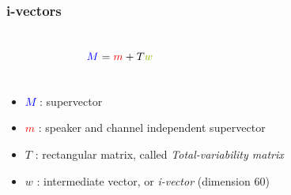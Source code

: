 \documentclass[11pt,english]{beamer}
\begin{document}
\begin{frame}
  \frametitle{i-vectors}
  \begin{columns}
    \begin{figure}
    
    \end{figure}
    
    
  
    $$\textcolor{blue}{M} = \textcolor{red}{m} + T\textcolor{mygreen}{w}$$
    
    \\
  \end{columns}
    \vspace{1cm}
    \begin{itemize}
    \item \textcolor{blue}{$M$} : supervector
    \item \textcolor{red}{$m$} : speaker and channel independent supervector
    \item $T$ : rectangular matrix, called \emph{Total-variability matrix}
    \item \textcolor{mygreen}{$w$} : intermediate vector, or \emph{i-vector}
      (dimension 60)
    \end{itemize}
  
\end{frame}
\end{document}
